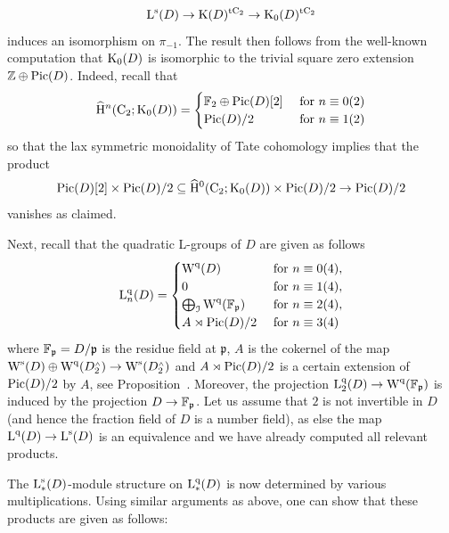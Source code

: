 \begin{example}
\[
\operatorname L^{\mathrm{s}}(D) \to \operatorname K(D)^{{\mathrm{t}\mathrm{C_2}}} \to \operatorname K_0(D)^{{\mathrm{t}\mathrm{C_2}}}
\]
induces an isomorphism on $\pi_{-1}$. The result then follows from the well-known computation that $\operatorname K_0(D)$ is isomorphic to the trivial square zero extension $\mathbb{Z} \oplus \operatorname{Pic}(D)$. Indeed, recall that 
\[
\widehat{\mathrm{H}}^n(\mathrm{C_2};\operatorname K_0(D)) = \begin{cases} \mathbb{F}_2 \oplus \operatorname{Pic}(D)[2] & \text{ for } n \equiv 0 (2) \\ \operatorname{Pic}(D)/2 & \text{ for } n \equiv 1(2) \end{cases}
\]
so that the lax symmetric monoidality of Tate cohomology implies that the product
\[
\operatorname{Pic}(D)[2] \times \operatorname{Pic}(D)/2 \subseteq \widehat{\mathrm{H}}^0(\mathrm{C_2};\operatorname K_0(D)) \times \operatorname{Pic}(D)/2 \to \operatorname{Pic}(D)/2
\]
vanishes as claimed.

Next, recall that the quadratic L-groups of $D$ are given as follows
\[
\operatorname L^{\mathrm{q}}_n(D) = \begin{cases} \operatorname W^{\mathrm{q}}(D) & \text{ for } n \equiv 0 (4),\\
						0 & \text{ for } n \equiv 1 (4), \\
						\bigoplus_{\mathcal{I}} \operatorname W^{\mathrm{q}}(\mathbb{F}_\mathfrak{p}) & \text{ for } n \equiv 2 (4),\\
						A \rtimes \operatorname{Pic}(D)/2 & \text{ for } n \equiv 3 (4) \end{cases}
\]
where $\mathbb{F}_{\mathfrak{p}} = D/\mathfrak{p}$ is the residue field at $\mathfrak{p}$, $A$ is the cokernel of the map $\operatorname W^{\mathrm{s}}(D) \oplus \operatorname W^{\mathrm{q}}(D^{\scriptscriptstyle\wedge}_2) \to \operatorname W^{\mathrm{s}}(D^{\scriptscriptstyle\wedge}_2)$ and $A \rtimes \operatorname{Pic}(D)/2$ is a certain extension of $\operatorname{Pic}(D)/2$ by $A$, see Proposition~. Moreover, the projection $\operatorname L_2^{\mathrm{q}}(D) \to \operatorname W^{\mathrm{q}}(\mathbb{F}_{\mathfrak{p}})$ is induced by the projection $D \to \mathbb{F}_\mathfrak{p}$.
Let us assume that $2$ is not invertible in $D$ (and hence the fraction field of $D$ is a number field), as else the map $\operatorname L^{\mathrm{q}}(D) \to \operatorname L^{\mathrm{s}}(D)$ is an equivalence and we have already computed all relevant products. 

The $\operatorname L^{\mathrm{s}}_*(D)$-module structure on $\operatorname L^{\mathrm{q}}_*(D)$ is now determined by various multiplications. Using similar arguments as above, one can show that these products are given as follows:


\end{example}
